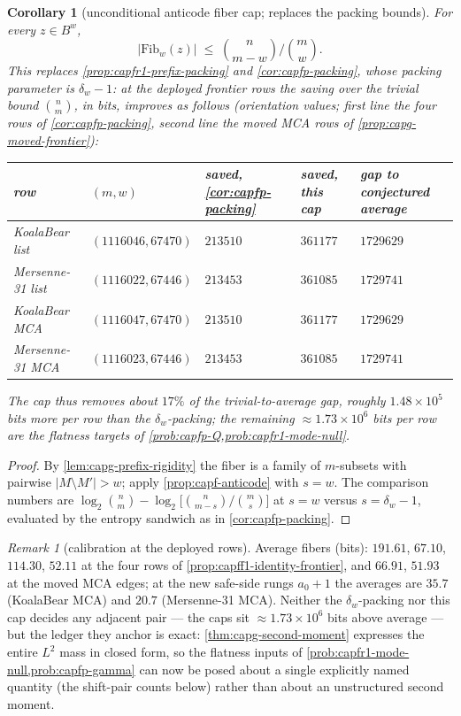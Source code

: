 \documentclass[11pt]{article}
\newtheorem{corollary}[corollary]{Corollary}
\theoremstyle{definition}
\theoremstyle{remark}
\newtheorem{remark}[remark]{Remark}
\begin{document}
\begin{corollary}[unconditional anticode fiber cap; replaces the
packing bounds]\label{cor:capg-anticode-cap}
For every $z\in B^{w}$,
\[
|\mathrm{Fib}_w(z)|\;\le\;\binom{n}{m-w}\Big/\binom{m}{w}.
\]
This replaces \cref{prop:capfr1-prefix-packing} and
\cref{cor:capfp-packing}, whose packing parameter is
$\delta_w-1$: at the deployed frontier rows the saving over the trivial
bound $\binom nm$, in bits, improves as follows (orientation values;
first line the four rows of \cref{cor:capfp-packing}, second line the
moved MCA rows of \cref{prop:capg-moved-frontier}):
\begin{center}\footnotesize
\begin{tabular}{@{}lllll@{}}
\toprule
row & $(m,w)$ & saved, \cref{cor:capfp-packing} & saved, this cap &
gap to conjectured average \\
\midrule
KoalaBear list & $(1116046,67470)$ & $213510$ & $361177$ & $1729629$ \\
Mersenne-31 list & $(1116022,67446)$ & $213453$ & $361085$ & $1729741$ \\
\addlinespace
KoalaBear MCA & $(1116047,67470)$ & $213510$ & $361177$ & $1729629$ \\
Mersenne-31 MCA & $(1116023,67446)$ & $213453$ & $361085$ & $1729741$ \\
\bottomrule
\end{tabular}
\end{center}
The cap thus removes about $17\%$ of the trivial-to-average gap, roughly
$1.48\times10^5$ bits more per row than the $\delta_w$-packing; the
remaining $\approx1.73\times10^6$ bits per row are the flatness targets
of \cref{prob:capfp-Q,prob:capfr1-mode-null}.
\end{corollary}

\begin{proof}
By \cref{lem:capg-prefix-rigidity} the fiber is a family of $m$-subsets
with pairwise $|M\setminus M'|>w$; apply \cref{prop:capf-anticode} with
$s=w$.  The comparison numbers are
$\log_2\binom nm-\log_2\bigl[\binom n{m-s}/\binom ms\bigr]$ at $s=w$
versus $s=\delta_w-1$, evaluated by the entropy sandwich as in
\cref{cor:capfp-packing}.
\end{proof}

\begin{remark}[calibration at the deployed rows]\label{rem:capg-calibration}
Average fibers (bits): $191.61$, $67.10$, $114.30$, $52.11$ at the four
rows of \cref{prop:capff1-identity-frontier}, and $66.91$, $51.93$ at the
moved MCA edges; at the new safe-side rungs $a_0+1$ the averages are
$35.7$ (KoalaBear MCA) and $20.7$ (Mersenne-31 MCA).  Neither the
$\delta_w$-packing nor this cap decides any adjacent pair --- the caps
sit $\approx1.73\times10^6$ bits above average --- but the ledger they
anchor is exact: \cref{thm:capg-second-moment} expresses the entire
$L^2$ mass in closed form, so the flatness inputs of
\cref{prob:capfr1-mode-null,prob:capfp-gamma} can now be posed about a
single explicitly named quantity (the shift-pair counts below) rather
than about an unstructured second moment.
\end{remark}
\end{document}
